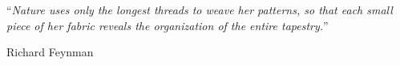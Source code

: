 \documentclass[
11pt, %
english, %
singlespacing, %
headsepline, %
]{main} %
\begin{document}

%
%
%
%
%


\vspace*{0.2\textheight}

\noindent\enquote{\itshape Nature uses only the longest threads to weave her patterns, so that each small piece of her fabric reveals the organization of the entire tapestry.}\bigbreak

\hfill Richard Feynman
\end{document}
